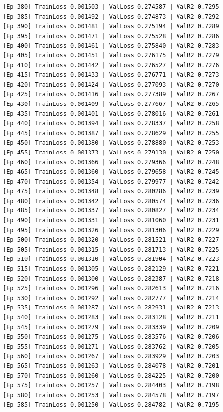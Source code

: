 \documentclass[a4paper, 12pt]{article}
\begin{document}
\begin{lstlisting}
[Ep 380] TrainLoss 0.001503 | ValLoss 0.274587 | ValR2 0.7295
[Ep 385] TrainLoss 0.001492 | ValLoss 0.274873 | ValR2 0.7292
[Ep 390] TrainLoss 0.001481 | ValLoss 0.275194 | ValR2 0.7289
[Ep 395] TrainLoss 0.001471 | ValLoss 0.275528 | ValR2 0.7286
[Ep 400] TrainLoss 0.001461 | ValLoss 0.275840 | ValR2 0.7283
[Ep 405] TrainLoss 0.001451 | ValLoss 0.276175 | ValR2 0.7279
[Ep 410] TrainLoss 0.001442 | ValLoss 0.276527 | ValR2 0.7276
[Ep 415] TrainLoss 0.001433 | ValLoss 0.276771 | ValR2 0.7273
[Ep 420] TrainLoss 0.001424 | ValLoss 0.277093 | ValR2 0.7270
[Ep 425] TrainLoss 0.001416 | ValLoss 0.277389 | ValR2 0.7267
[Ep 430] TrainLoss 0.001409 | ValLoss 0.277667 | ValR2 0.7265
[Ep 435] TrainLoss 0.001401 | ValLoss 0.278016 | ValR2 0.7261
[Ep 440] TrainLoss 0.001394 | ValLoss 0.278337 | ValR2 0.7258
[Ep 445] TrainLoss 0.001387 | ValLoss 0.278629 | ValR2 0.7255
[Ep 450] TrainLoss 0.001380 | ValLoss 0.278880 | ValR2 0.7253
[Ep 455] TrainLoss 0.001373 | ValLoss 0.279130 | ValR2 0.7250
[Ep 460] TrainLoss 0.001366 | ValLoss 0.279366 | ValR2 0.7248
[Ep 465] TrainLoss 0.001360 | ValLoss 0.279658 | ValR2 0.7245
[Ep 470] TrainLoss 0.001354 | ValLoss 0.279977 | ValR2 0.7242
[Ep 475] TrainLoss 0.001348 | ValLoss 0.280286 | ValR2 0.7239
[Ep 480] TrainLoss 0.001342 | ValLoss 0.280574 | ValR2 0.7236
[Ep 485] TrainLoss 0.001337 | ValLoss 0.280827 | ValR2 0.7234
[Ep 490] TrainLoss 0.001331 | ValLoss 0.281060 | ValR2 0.7231
[Ep 495] TrainLoss 0.001326 | ValLoss 0.281306 | ValR2 0.7229
[Ep 500] TrainLoss 0.001320 | ValLoss 0.281521 | ValR2 0.7227
[Ep 505] TrainLoss 0.001315 | ValLoss 0.281713 | ValR2 0.7225
[Ep 510] TrainLoss 0.001310 | ValLoss 0.281904 | ValR2 0.7223
[Ep 515] TrainLoss 0.001305 | ValLoss 0.282129 | ValR2 0.7221
[Ep 520] TrainLoss 0.001300 | ValLoss 0.282387 | ValR2 0.7218
[Ep 525] TrainLoss 0.001296 | ValLoss 0.282613 | ValR2 0.7216
[Ep 530] TrainLoss 0.001292 | ValLoss 0.282777 | ValR2 0.7214
[Ep 535] TrainLoss 0.001287 | ValLoss 0.282931 | ValR2 0.7213
[Ep 540] TrainLoss 0.001283 | ValLoss 0.283128 | ValR2 0.7211
[Ep 545] TrainLoss 0.001279 | ValLoss 0.283339 | ValR2 0.7209
[Ep 550] TrainLoss 0.001275 | ValLoss 0.283576 | ValR2 0.7206
[Ep 555] TrainLoss 0.001271 | ValLoss 0.283762 | ValR2 0.7205
[Ep 560] TrainLoss 0.001267 | ValLoss 0.283929 | ValR2 0.7203
[Ep 565] TrainLoss 0.001263 | ValLoss 0.284078 | ValR2 0.7201
[Ep 570] TrainLoss 0.001260 | ValLoss 0.284225 | ValR2 0.7200
[Ep 575] TrainLoss 0.001257 | ValLoss 0.284403 | ValR2 0.7198
[Ep 580] TrainLoss 0.001253 | ValLoss 0.284578 | ValR2 0.7197
[Ep 585] TrainLoss 0.001250 | ValLoss 0.284782 | ValR2 0.7195

\end{lstlisting}
\end{document}
